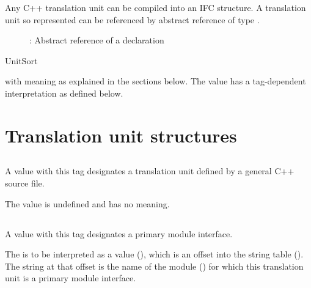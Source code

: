 \label{sec:ifc-tu}

Any C++ translation unit can be compiled into an IFC structure.  A translation unit so represented can be referenced by abstract reference
of type .  
%
\begin{figure}[htbp]
	\centering
	\caption{: Abstract reference of a declaration}
	\label{fig:ifc-unit-index}
\end{figure}

\begin{SortEnum}{UnitSort}
\end{SortEnum}

with meaning as explained in the sections below.  The  value has a tag-dependent interpretation as defined below.

\section{Translation unit structures}
\label{sec:ifc:tu-structures}

\subsection{}
\label{sec:ifc:UnitSort:Source}
A  value with this tag designates a translation unit defined by a general C++ source file.

The  value is undefined and has no meaning.


\subsection{}
\label{sec:ifc:UnitSort:Primary}

A  value with this tag designates a primary module interface.

The  is to be interpreted as a  value (), 
which is an offset into the string table ().  
The string at that offset is the name of the module () for which this translation unit is a primary module interface.


\subsection{}
\label{sec:ifc:UnitSort:Partition}

